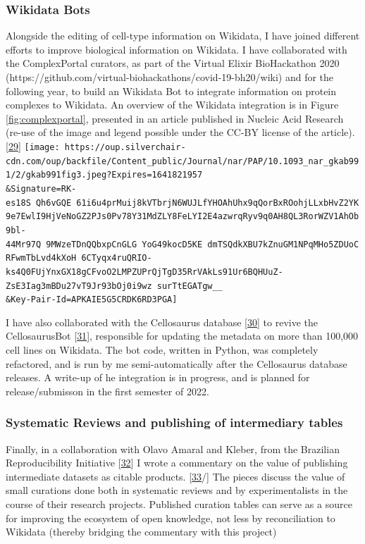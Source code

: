 \hypertarget{wikidata-bots}{%
\subsubsection{Wikidata Bots}\label{wikidata-bots}}

Alongside the editing of cell-type information on Wikidata, I have joined different efforts to improve biological information on Wikidata.
I have collaborated with the ComplexPortal curators, as part of the Virtual Elixir BioHackathon 2020 (https://github.com/virtual-biohackathons/covid-19-bh20/wiki) and for the following year, to build an Wikidata Bot to integrate information on protein complexes to Wikidata. An overview of the Wikidata integration is in Figure \ref{fig:complexportal}, presented in an article published in Nucleic Acid Research (re-use of the image and legend possible under the CC-BY license of the article). {[}\protect\hyperlink{ref-CQRJ53gu}{29}{]}
\texttt{[image: https://oup.silverchair-cdn.com/oup/backfile/Content\_public/Journal/nar/PAP/10.1093\_nar\_gkab991/2/gkab991fig3.jpeg?Expires=1641821957\\\&Signature=RK-es18S~Qh6vGQE~61i6u4prMuij8kVTbrjN6WUJLfYHOAhUhx9qQorBxROohjLLxbHvZ2YK9e7EwlI9HjVeNoGZ2PJs0Pv78Y31MdZLY8FeLYI2E4azwrqRyv9q0AH8QL3RorWZV1AhOb9bl-44Mr97Q~9MWzeTDnQQbxpCnGLG~YoG49kocD5KE~dmTSQdkXBU7kZnuGM1NPqMHo5ZDUoCRFwmTbLvd4kXoH~6CTyqx4ruQRIO-ks4Q0FUjYnxGX18gCFvoO2LMPZUPrQjTgD35RrVAkLs91Ur6BQHUuZ-ZsE3Iag3mBDu27vT9Jr93bOj0i9wz~surTtEGATgw\_\_\\\&Key-Pair-Id=APKAIE5G5CRDK6RD3PGA]}

I have also collaborated with the Cellosaurus database {[}\protect\hyperlink{ref-1DguATd9G}{30}{]} to revive the CellosaurusBot {[}\protect\hyperlink{ref-lMQxhx3q}{31}{]}, responsible for updating the metadata on more than 100,000 cell lines on Wikidata. The bot code, written in Python, was completely refactored, and is run by me semi-automatically after the Cellosaurus database releases. A write-up of he integration is in progress, and is planned for release/submisson in the first semester of 2022.

\hypertarget{systematic-reviews-and-publishing-of-intermediary-tables}{%
\subsubsection{Systematic Reviews and publishing of intermediary tables}\label{systematic-reviews-and-publishing-of-intermediary-tables}}

Finally, in a collaboration with Olavo Amaral and Kleber, from the Brazilian Reproducibility Initiative {[}\protect\hyperlink{ref-F2mYjDJ0}{32}{]} I wrote a commentary on the value of publishing intermediate datasets as citable products. {[}\protect\hyperlink{ref-HbZ13t8l}{33}/{]}
The pieces discuss the value of small curations done both in systematic reviews and by experimentalists in the course of their research projects. Published curation tables can serve as a source for improving the ecosystem of open knowledge, not less by reconciliation to Wikidata (thereby bridging the commentary with this project)

